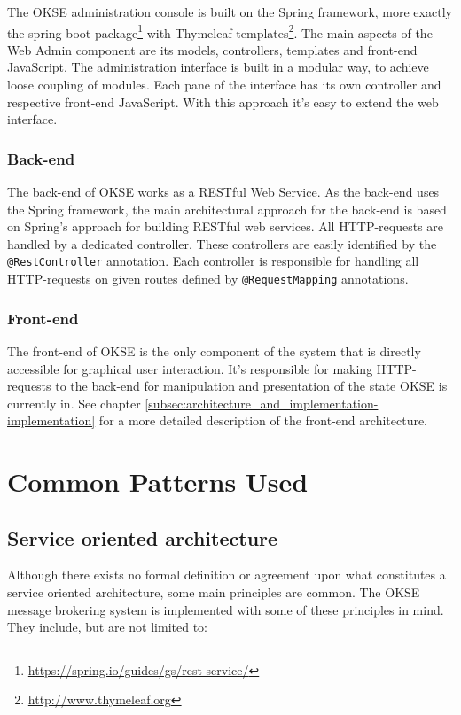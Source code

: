 The OKSE administration console is built on the Spring framework, more exactly the spring-boot package\footnote{\url{https://spring.io/guides/gs/rest-service/}} with Thymeleaf-templates\footnote{\url{http://www.thymeleaf.org}}. The main aspects of the Web Admin component are its models, controllers, templates and front-end JavaScript. The administration interface is built in a modular way, to achieve loose coupling of modules. Each pane of the interface has its own controller and respective front-end JavaScript.  With this approach it's easy to extend the web interface.

\subsubsection{Back-end}

The back-end of OKSE works as a RESTful Web Service. As the back-end uses the Spring framework, the main architectural approach for the back-end is based on Spring’s approach for building RESTful web services. All HTTP-requests are handled by a dedicated controller. These controllers are easily identified by the \verb!@RestController! annotation. Each controller is responsible for handling all HTTP-requests on given routes defined by \verb!@RequestMapping! annotations.  

\subsubsection{Front-end}

The front-end of OKSE is the only component of the system that is directly accessible for graphical user interaction. It's responsible for making HTTP-requests to the back-end for manipulation and presentation of the state OKSE is currently in. See chapter \ref{subsec:architecture_and_implementation-implementation} for a more detailed description of the front-end architecture.

\section{Common Patterns Used}
\label{sec:common-patterns-used}

\subsection{Service oriented architecture}

Although there exists no formal definition or agreement upon what constitutes a service oriented architecture, some main principles are common. The OKSE message brokering system is implemented with some of these principles in mind. They include, but are not limited to:

